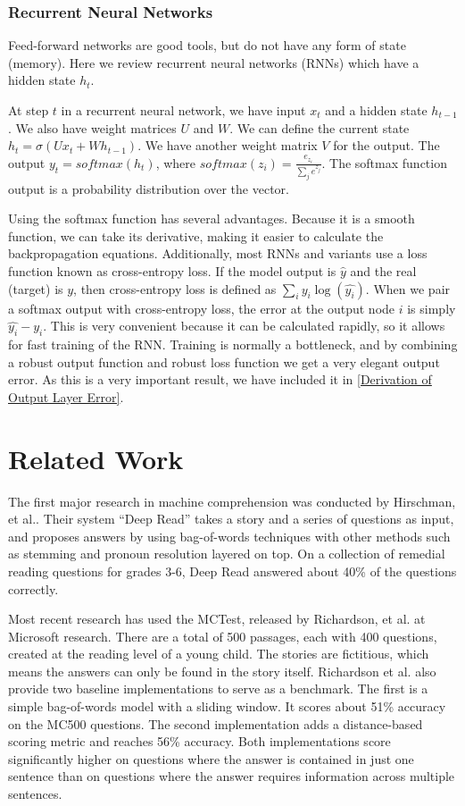 \documentclass[pageno]{jpaper}
\begin{document}
\subsubsection{Recurrent Neural Networks}
\label{Recurrent Neural Networks}

Feed-forward networks are good tools, but do not have any form of state
(memory). Here we review recurrent neural networks (RNNs) which have a hidden
state $h_t$.

At step $t$ in a recurrent neural network, we have input $x_t$ and a hidden
state $h_{t-1}$. We also have weight matrices $U$ and $W$. We can define the
current state $h_t = \sigma(Ux_t + Wh_{t-1})$. We have another weight matrix $V$
for the output. The output $y_t = softmax(h_t)$, where $softmax(z_i) =
\frac{e_{z_i}}{\sum_j e^{z_j}}$. The softmax function output is a probability
distribution over the vector.

Using the softmax function has several advantages. Because it is a smooth
function, we can take its derivative, making it easier to calculate the
backpropagation equations. Additionally, most RNNs and variants use a loss
function known as cross-entropy loss. If the model output is $\hat{y}$ and the
real (target) is $y$, then cross-entropy loss is defined as $\sum_i y_i
\log(\hat{y_{i}})$. When we pair a softmax output with cross-entropy loss, the
error at the output node $i$ is simply $\hat{y_i} - y_i$. This is very
convenient because it can be calculated rapidly, so it allows for fast training
of the RNN. Training is normally a bottleneck, and by combining a robust output
function and robust loss function we get a very elegant output error. As this is
a very important result, we have included it in \ref{Derivation of Output Layer
Error}.

\section{Related Work}
\label{Related Work}

The first major research in machine comprehension was conducted by Hirschman,
et al.\cite{Hirschman1999}. Their system ``Deep Read'' takes a story and a
series of questions as input, and proposes answers by using bag-of-words
techniques with other methods such as stemming and pronoun resolution layered
on top. On a collection of remedial reading questions for grades 3-6, Deep Read
answered about 40\% of the questions correctly.

Most recent research has used the MCTest\cite{Richardson2013}, released by
Richardson, et al. at Microsoft research. There are a total of 500 passages,
each with 400 questions, created at the reading level of a young child. The
stories are fictitious, which means the answers can only be found in the story
itself. Richardson et al. also provide two baseline implementations to serve as
a benchmark. The first is a simple bag-of-words model with a sliding window. It
scores about 51\% accuracy on the MC500 questions. The second implementation
adds a distance-based scoring metric and reaches 56\% accuracy. Both
implementations score significantly higher on questions where the answer is
contained in just one sentence than on questions where the answer requires
information across multiple sentences.
\end{document}
